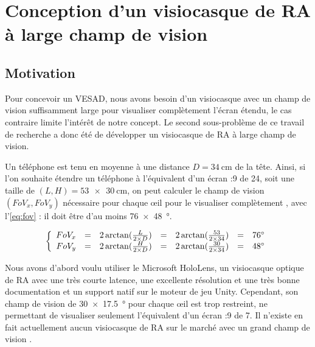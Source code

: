 \chapter{Conception d'un visiocasque de RA à large champ de vision}
\label{ch:methodology}

\section{Motivation}
Pour concevoir un VESAD, nous avons besoin d'un visiocasque avec un champ de vision suffisamment large pour visualiser complètement l'écran étendu, le cas contraire limite l'intérêt de notre concept. Le second sous-problème de ce travail de recherche a donc été de développer un visiocasque de RA à large champ de vision.

Un téléphone est tenu en moyenne à une distance $D=\SI{34}{\cm}$ \citep{Bababekova2011} de la tête. Ainsi, si l'on souhaite étendre un téléphone à l'équivalent d'un écran {:9} de \SI{24}{\inch}, soit une taille de $(L,H)=\SI{53x30}{\cm}$, on peut calculer le champ de vision $(FoV_x,FoV_y)$ nécessaire pour chaque \oe il pour le visualiser complètement , avec l'\autoref{eq:fov} : il doit être d'au moins \SI{76x48}{\degree}.

\begin{equation}
  \label{eq:fov}
  \left \{
  \begin{array}{r c c c c c l}
    FoV_x & = & 2 \arctan (\frac{L}{2 \times D}) & = & 2 \arctan (\frac{53}{2 \times 34}) & = & \ang{76}\\
    FoV_y & = & 2 \arctan (\frac{H}{2 \times D}) & = & 2 \arctan (\frac{30}{2 \times 34}) & = & \ang{48}
  \end{array}
  \right .
\end{equation}


Nous avons d'abord voulu utiliser le Microsoft HoloLens, un visiocasque optique de RA avec une très courte latence, une excellente résolution et une très bonne documentation et un support natif sur le moteur de jeu Unity. Cependant, son champ de vision de \SI{30x17.5}{\degree} pour chaque \oe il \citep{Kreylos2015} est trop restreint, ne permettant de visualiser seulement l'équivalent d'un écran {:9} de \SI{7}{\inch}. Il n'existe en fait actuellement aucun visiocasque de RA sur le marché avec un grand champ de vision \citep[p. 25]{Millette2016}.


